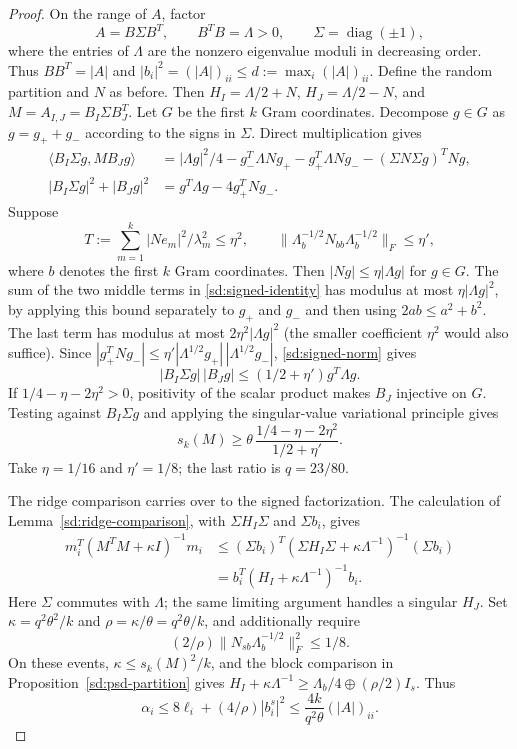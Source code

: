 \begin{proof}
On the range of $A$, factor
\[
 A=B\Sigma B^T,\qquad B^TB=\Lambda>0,\qquad
 \Sigma=\operatorname{diag}(\pm1),
\]
where the entries of $\Lambda$ are the nonzero eigenvalue moduli
in decreasing order.  Thus $BB^T=|A|$ and
$|b_i|^2=(|A|)_{ii}\leq d:=\max_i(|A|)_{ii}$.
Define the random partition and $N$ as before.  Then
$H_I=\Lambda/2+N$, $H_J=\Lambda/2-N$, and
$M=A_{I,J}=B_I\Sigma B_J^T$.
Let $G$ be the first $k$ Gram coordinates.
Decompose $g\in G$ as $g=g_++g_-$ according to the signs in $\Sigma$.
Direct multiplication gives
\begin{align}
 \langle B_I\Sigma g,MB_Jg\rangle
 &=|\Lambda g|^2/4-g_-^T\Lambda Ng_+
      -g_+^T\Lambda Ng_-
      -(\Sigma N\Sigma g)^TNg,\label{sd:signed-identity}\\
 |B_I\Sigma g|^2+|B_Jg|^2
 &=g^T\Lambda g-4g_+^TNg_-.\label{sd:signed-norm}
\end{align}
Suppose
\begin{equation}\label{sd:signed-events}
 T:=\sum_{m=1}^k |Ne_m|^2/\lambda_m^2\leq\eta^2,\qquad
 \|\Lambda_b^{-1/2}N_{bb}\Lambda_b^{-1/2}\|_F\leq\eta',
\end{equation}
where $b$ denotes the first $k$ Gram coordinates.
Then $|Ng|\leq\eta|\Lambda g|$ for $g\in G$.
The sum of the two middle terms in \eqref{sd:signed-identity}
has modulus at most $\eta|\Lambda g|^2$, by applying this bound
separately to $g_+$ and $g_-$ and then using $2ab\leq a^2+b^2$.
The last term has modulus at most $2\eta^2|\Lambda g|^2$
(the smaller coefficient $\eta^2$ would also suffice).
Since
$|g_+^TNg_-|\leq
\eta'|\Lambda^{1/2}g_+|\,|\Lambda^{1/2}g_-|$,
\eqref{sd:signed-norm} gives
\[
 |B_I\Sigma g|\,|B_Jg|
 \leq(1/2+\eta')g^T\Lambda g.
\]
If $1/4-\eta-2\eta^2>0$, positivity of the scalar product makes
$B_J$ injective on $G$.  Testing against $B_I\Sigma g$ and applying
the singular-value variational principle gives
\begin{equation}\label{sd:signed-sv}
 s_k(M)\geq
 \theta\,\frac{1/4-\eta-2\eta^2}{1/2+\eta'}.
\end{equation}
Take $\eta=1/16$ and $\eta'=1/8$; the last ratio is $q=23/80$.

The ridge comparison carries over to the signed factorization.
The calculation of Lemma~\ref{sd:ridge-comparison}, with
$\Sigma H_I\Sigma$ and $\Sigma b_i$, gives
\begin{align*}
 m_i^T(M^TM+\kappa I)^{-1}m_i
 &\leq(\Sigma b_i)^T
    (\Sigma H_I\Sigma+\kappa\Lambda^{-1})^{-1}(\Sigma b_i)\\
 &=b_i^T(H_I+\kappa\Lambda^{-1})^{-1}b_i.
\end{align*}
Here $\Sigma$ commutes with $\Lambda$; the same limiting argument
handles a singular $H_J$.
Set $\kappa=q^2\theta^2/k$ and $\rho=\kappa/\theta=q^2\theta/k$,
and additionally require
\[
 (2/\rho)\|N_{sb}\Lambda_b^{-1/2}\|_F^2\leq1/8.
\]
On these events, $\kappa\leq s_k(M)^2/k$, and the block comparison
in Proposition~\ref{sd:psd-partition} gives
$H_I+\kappa\Lambda^{-1}\geq\Lambda_b/4\oplus(\rho/2)I_s$.
Thus
\[
 \alpha_i\leq8\ell_i+(4/\rho)|b_i^s|^2
       \leq\frac{4k}{q^2\theta}(|A|)_{ii}.
\]


\end{proof}
